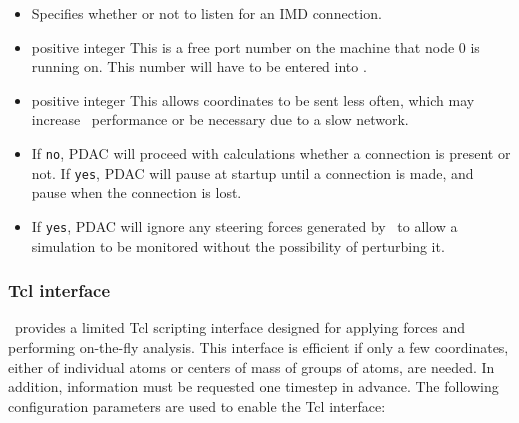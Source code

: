 \begin{itemize}
\item
{}
{Specifies whether or not to listen for an IMD connection.}

\item
{}
{positive integer}
{This is a free port number on the machine that node 0 is running on.
This number will have to be entered into \VMD.}

\item
{}
{positive integer}
{This allows coordinates to be sent less often, which may increase
\PDAC\ performance or be necessary due to a slow network.}

\item 
{}
{If {\tt no}, PDAC will proceed with calculations whether a connection is
present or not.  If {\tt yes}, PDAC will pause at startup until a connection is
made, and pause when the connection is lost.}

\item 
{}
{If {\tt yes}, PDAC will ignore any steering forces generated by \VMD\ to allow
a simulation to be monitored without the possibility of perturbing it.}

\end{itemize}


\subsubsection{Tcl interface}

\PDAC\ provides a limited Tcl scripting interface designed for applying forces and performing on-the-fly analysis.
This interface is efficient if only a few coordinates, either of individual atoms or centers of mass of groups of atoms, are needed.
In addition, information must be requested one timestep in advance.
The following configuration parameters are used to enable the Tcl interface:

